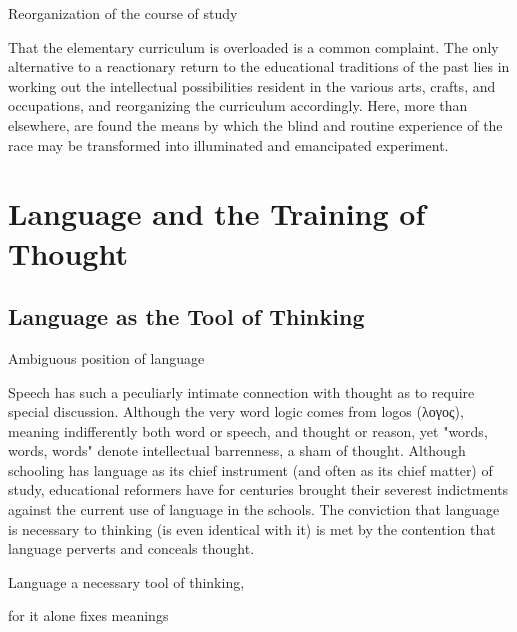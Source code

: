 \documentclass[letterpaper]{book}
\begin{document}
Reorganization of the course of study

That the elementary curriculum is overloaded is a common complaint. The
only alternative to a reactionary return to the educational traditions
of the past lies in working out the intellectual possibilities resident
in the various arts, crafts, and occupations, and reorganizing the
curriculum accordingly. Here, more than elsewhere, are found the means
by which the blind and routine experience of the race may be transformed
into illuminated and emancipated
experiment.

\chapter{Language and the Training of Thought}

\section{Language as the Tool of Thinking}

Ambiguous position of language

Speech has such a peculiarly intimate connection with thought as to
require special discussion. Although the very word logic comes from
logos (\textgreek{λογος}), meaning indifferently both word or speech,
and thought or reason, yet "words, words, words" denote intellectual
barrenness, a sham of thought. Although schooling has language as its
chief instrument (and often as its chief matter) of study, educational
reformers have for centuries brought their severest indictments against
the current use of language in the schools. The conviction that language
is necessary to thinking (is even identical with it) is met by the
contention that language perverts and conceals thought.

Language a necessary tool of thinking,

for it alone fixes meanings
\end{document}
